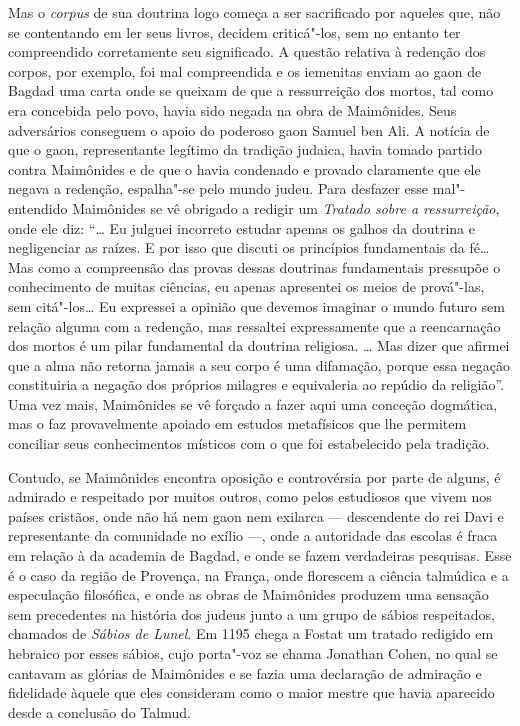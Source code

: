 Mas o \emph{corpus} de sua doutrina logo começa a ser sacrificado por
aqueles que, não se contentando em ler seus livros, decidem criticá"-los,
sem no entanto ter compreendido corretamente seu significado. A questão
relativa à redenção dos corpos, por exemplo, foi mal compreendida e os
iemenitas enviam ao gaon de Bagdad uma carta onde se queixam de que a
ressurreição dos mortos, tal como era concebida pelo povo, havia sido
negada na obra de Maimônides. Seus adversários conseguem o apoio do poderoso 
gaon Samuel ben Ali. A notícia de que o gaon, representante legítimo da tradição
judaica, havia tomado partido contra Maimônides e de que o havia
condenado e provado claramente que ele negava a redenção, espalha"-se
pelo mundo judeu. Para desfazer esse mal"-entendido Maimônides se vê
obrigado a redigir um \emph{Tratado sobre a ressurreição}, onde ele diz:
``\ldots{} Eu julguei incorreto estudar apenas os galhos da doutrina e
negligenciar as raízes. E por isso que discuti os princípios
fundamentais da fé\ldots{} Mas como a compreensão das provas dessas
doutrinas fundamentais pressupõe o conhecimento de muitas ciências, eu
apenas apresentei os meios de prová"-las, sem citá"-los\ldots{} Eu expressei a
opinião que devemos imaginar o mundo futuro sem relação alguma com a
redenção, mas ressaltei expressamente que a reencarnação dos mortos é
um pilar fundamental da doutrina religiosa. \ldots{} Mas dizer que afirmei
que a alma não retorna jamais a seu corpo é uma difamação, porque essa
negação constituiria a negação dos próprios milagres e equivaleria ao
repúdio da religião''. Uma vez mais, Maimônides se vê forçado a fazer
aqui uma conceção dogmática, mas o faz provavelmente apoiado em estudos
metafísicos que lhe permitem conciliar seus conhecimentos místicos com
o que foi estabelecido pela tradição.

Contudo, se Maimônides encontra oposição e controvérsia por parte de
alguns, é admirado e respeitado por muitos outros, como pelos
estudiosos que vivem nos países cristãos, onde não há nem gaon nem
exilarca --- descendente do rei Davi e representante da comunidade no exílio ---, 
onde a autoridade das
escolas é fraca em relação à da academia de Bagdad, e onde se fazem
verdadeiras pesquisas. Esse é o caso da região de Provença, na França,
onde florescem a ciência talmúdica e a especulação filosófica, e onde as
obras de Maimônides produzem uma sensação sem precedentes na história
dos judeus junto a um grupo de sábios respeitados, chamados de \emph{Sábios
de Lunel}. Em 1195 chega a Fostat um tratado redigido em hebraico por
esses sábios, cujo porta"-voz se chama Jonathan Cohen, no qual se
cantavam as glórias de Maimônides e se fazia uma declaração de admiração
e fidelidade àquele que eles consideram como o maior mestre que havia
aparecido desde a conclusão do Talmud.

